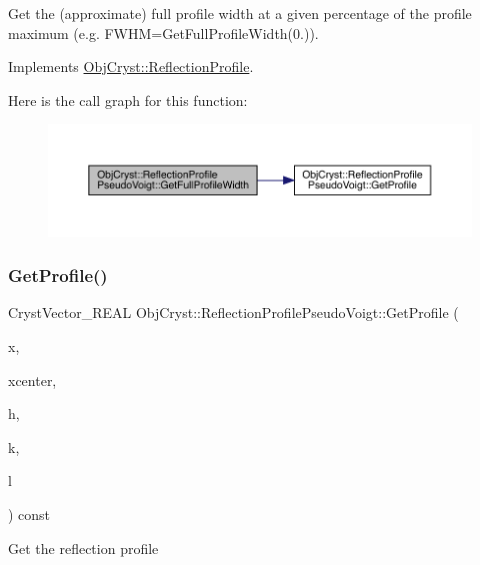 Get the (approximate) full profile width at a given percentage of the profile maximum (e.\+g. F\+W\+HM=Get\+Full\+Profile\+Width(0.)). 

Implements \mbox{\hyperlink{class_obj_cryst_1_1_reflection_profile_ac6d2a69e63c3efd06f30ab134062bbc0}{Obj\+Cryst\+::\+Reflection\+Profile}}.

Here is the call graph for this function\+:
\nopagebreak
\begin{figure}[H]
\begin{center}
\leavevmode
\includegraphics[width=350pt]{class_obj_cryst_1_1_reflection_profile_pseudo_voigt_aab311ae897daf5e738eb7727e57fd0c7_cgraph}
\end{center}
\end{figure}
\mbox{\label{class_obj_cryst_1_1_reflection_profile_pseudo_voigt_aa8a7489c58c10252c977de54e0aa6292}} 
\subsubsection{\texorpdfstring{GetProfile()}{GetProfile()}}
{\footnotesize\ttfamily Cryst\+Vector\+\_\+\+R\+E\+AL Obj\+Cryst\+::\+Reflection\+Profile\+Pseudo\+Voigt\+::\+Get\+Profile (\begin{DoxyParamCaption}\item[{const Cryst\+Vector\+\_\+\+R\+E\+AL \&}]{x,  }\item[{const R\+E\+AL}]{xcenter,  }\item[{const R\+E\+AL}]{h,  }\item[{const R\+E\+AL}]{k,  }\item[{const R\+E\+AL}]{l }\end{DoxyParamCaption}) const\hspace{0.3cm}{\ttfamily [virtual]}}

Get the reflection profile


